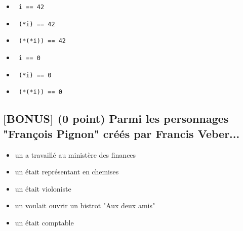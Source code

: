 \documentclass[11pt,a4paper]{article}
\begin{document}
\begin{itemize}
  \item[\CaseCoche] \lstinline[style=algorithmique]! i == 42 ! \\
  \item[\CaseCoche] \lstinline[style=algorithmique]! (*i) == 42 ! \\
  \item[\CaseCoche] \lstinline[style=algorithmique]! (*(*i)) == 42 ! \\
  \item[\CaseCoche] \lstinline[style=algorithmique]! i == 0 ! \\
  \item[\CaseCoche] \lstinline[style=algorithmique]! (*i) == 0 ! \\
  \item[\checkmark] \lstinline[style=algorithmique]! (*(*i)) == 0 ! \\
\end{itemize}


\bigskip


\subsection{[BONUS] (0 point) Parmi les personnages "François Pignon" créés par Francis Veber... }

\begin{itemize}
  \item[\checkmark] un a travaillé au ministère des finances \\ %
  \item[\checkmark] un était représentant en chemises \\ %
  \item[\CaseCoche] un était violoniste \\ %
  \item[\CaseCoche] un voulait ouvrir un bistrot "Aux deux amis" \\ %
  \item[\CaseCoche] un était comptable \\ %
\end{itemize}
\end{document}
